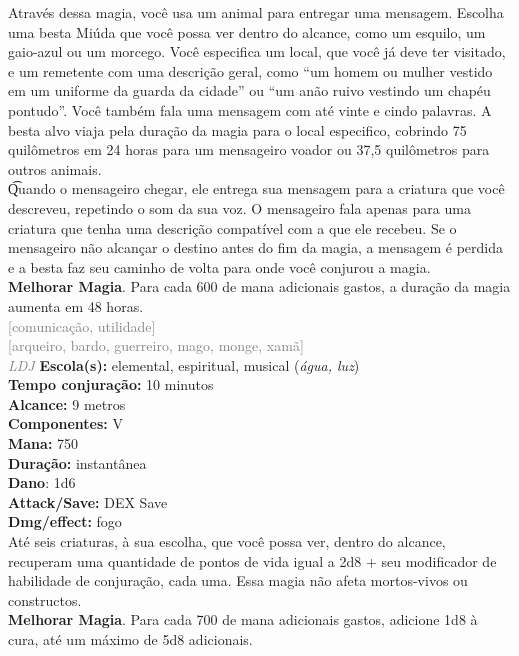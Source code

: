 \documentclass{RPG_Adventure}[2021/10/20]
\begin{document}
{\normalsize Através dessa magia, você usa um animal para entregar uma mensagem. Escolha uma besta Miúda que você possa ver dentro do alcance, como um esquilo, um gaio-azul ou um morcego. Você especifica um local, que você já deve ter visitado, e um remetente com uma descrição geral, como “um homem ou mulher vestido em um uniforme da guarda da cidade” ou “um anão ruivo vestindo um chapéu pontudo”. Você também fala uma mensagem com até vinte e cindo palavras. A besta alvo viaja pela duração da magia para o local especifico, cobrindo 75 quilômetros em 24 horas para um mensageiro voador ou 37,5 quilômetros para outros animais.\\\t Quando o mensageiro chegar, ele entrega sua mensagem para a criatura que você descreveu, repetindo o som da sua voz. O mensageiro fala apenas para uma criatura que tenha uma descrição compatível com a que ele recebeu. Se o mensageiro não alcançar o destino antes do fim da magia, a mensagem é perdida e a besta faz seu caminho de volta para onde você conjurou a magia.\\\t \textbf{Melhorar Magia}. Para cada 600 de mana adicionais gastos, a duração da magia aumenta em 48 horas.\\}
{\scriptsize \textcolor{gray}{[comunicação, utilidade]\\}}
{\scriptsize \textcolor{gray}{[arqueiro, bardo, guerreiro, mago, monge, xamã]\\}}
{\tiny \textcolor{gray}{\textit{LDJ}}}\jump{}
{\small \t \textbf{Escola(s):} elemental, espiritual, musical (\textit{água, luz})\\\t \textbf{Tempo conjuração:} 10 minutos\\\t \textbf{Alcance:} 9 metros\\\t \textbf{Componentes:} V\\\t \textbf{Mana:} 750\\\t \textbf{Duração:} instantânea\\\t \textbf{Dano}: 1d6\\\t \textbf{Attack/Save:} DEX Save\\\t \textbf{Dmg/effect:} fogo\\}
{\normalsize Até seis criaturas, à sua escolha, que você possa ver, dentro do alcance, recuperam uma quantidade de pontos de vida igual a 2d8 + seu modificador de habilidade de conjuração, cada uma. Essa magia não afeta mortos-vivos ou constructos.\\\t \textbf{Melhorar Magia}. Para cada 700 de mana adicionais gastos, adicione 1d8 à cura, até um máximo de 5d8 adicionais.\\}
\end{document}
